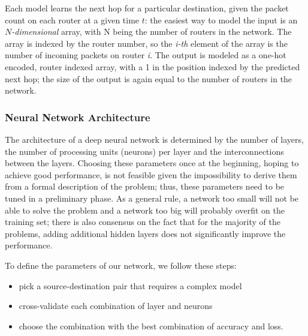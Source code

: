 Each model learns the next hop for a particular destination, given the packet count on each router at a given time $t$: the easiest way to model the input is an $N$\textit{-dimensional} array, with N being the number of routers in the network. The array is indexed by the router number, so the \textit{i-th} element of the array is the number of incoming packets on router \textit{i}. The output is modeled as a one-hot encoded, router indexed array, with a 1 in the position indexed by the predicted next hop; the size of the output is again equal to the number of routers in the network.

\subsubsection{Neural Network Architecture}
The architecture of a deep neural network is determined by the number of layers, the number of processing units (neurons) per layer and the interconnections between the layers. Choosing these parameters once at the beginning, hoping to achieve good performance, is not feasible given the impossibility to derive them from a formal description of the problem; thus, these parameters need to be tuned in a preliminary phase. As a general rule, a network too small will not be able to solve the problem and a network too big will probably overfit on the training set; there is also consensus on the fact that for the majority of the problems, adding additional hidden layers does not significantly improve the performance.

To define the parameters of our network, we follow these steps:
\begin{itemize}
\item pick a source-destination pair that requires a complex model
\item cross-validate each combination of layer and neurons
\item choose the combination with the best combination of accuracy and loss.
\end{itemize}

